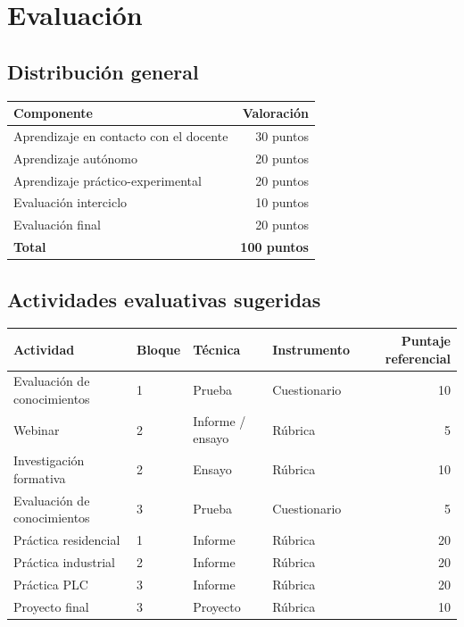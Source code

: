 \documentclass[
  spanish,
  letterpaper,
  DIV=11,
  numbers=noendperiod]{scrreprt}
\newcounter{none} %
\begin{document}

\chapter{Evaluación}\label{evaluaciuxf3n}

\section{Distribución general}\label{distribuciuxf3n-general}

{\def\LTcaptype{none} %
\begin{longtable}[]{@{}lr@{}}
\toprule\noalign{}
Componente & Valoración \\
\midrule\noalign{}
\endhead
\bottomrule\noalign{}
\endlastfoot
Aprendizaje en contacto con el docente & 30 puntos \\
Aprendizaje autónomo & 20 puntos \\
Aprendizaje práctico-experimental & 20 puntos \\
Evaluación interciclo & 10 puntos \\
Evaluación final & 20 puntos \\
\textbf{Total} & \textbf{100 puntos} \\
\end{longtable}
}

\section{Actividades evaluativas
sugeridas}\label{actividades-evaluativas-sugeridas}

{\def\LTcaptype{none} %
\begin{longtable}[]{@{}llllr@{}}
\toprule\noalign{}
Actividad & Bloque & Técnica & Instrumento & Puntaje referencial \\
\midrule\noalign{}
\endhead
\bottomrule\noalign{}
\endlastfoot
Evaluación de conocimientos & 1 & Prueba & Cuestionario & 10 \\
Webinar & 2 & Informe / ensayo & Rúbrica & 5 \\
Investigación formativa & 2 & Ensayo & Rúbrica & 10 \\
Evaluación de conocimientos & 3 & Prueba & Cuestionario & 5 \\
Práctica residencial & 1 & Informe & Rúbrica & 20 \\
Práctica industrial & 2 & Informe & Rúbrica & 20 \\
Práctica PLC & 3 & Informe & Rúbrica & 20 \\
Proyecto final & 3 & Proyecto & Rúbrica & 10 \\
\end{longtable}
}
\end{document}
